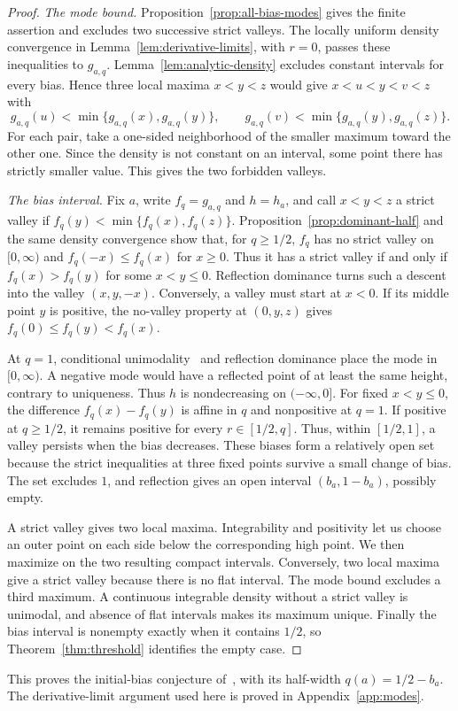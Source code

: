 \begin{proof}
\emph{The mode bound.} Proposition~\ref{prop:all-bias-modes}
gives the finite assertion and excludes two successive strict valleys.
The locally uniform density convergence in
Lemma~\ref{lem:derivative-limits}, with $r=0$, passes these
inequalities to $g_{a,q}$.
Lemma~\ref{lem:analytic-density} excludes constant intervals
for every bias. Hence three local maxima $x<y<z$
would give
$x<u<y<v<z$ with
\[
 g_{a,q}(u)<\min\{g_{a,q}(x),g_{a,q}(y)\},\qquad
 g_{a,q}(v)<\min\{g_{a,q}(y),g_{a,q}(z)\}.
\]
For each pair, take a one-sided neighborhood of the smaller maximum
toward the other one. Since the density is not constant on an
interval, some point there has strictly smaller value. This gives
the two forbidden valleys.

\emph{The bias interval.} Fix $a$, write $f_q=g_{a,q}$ and $h=h_a$,
and call $x<y<z$ a strict valley if $f_q(y)<\min\{f_q(x),f_q(z)\}$.
Proposition~\ref{prop:dominant-half} and the same density convergence show that,
for $q\ge1/2$, $f_q$ has no strict valley on $[0,\infty)$ and
$f_q(-x)\le f_q(x)$ for $x\ge0$.
Thus it has a strict valley if and only if
$f_q(x)>f_q(y)$ for some $x<y\le0$. Reflection dominance turns
such a descent into the valley $(x,y,-x)$. Conversely, a valley
must start at $x<0$. If its middle point $y$ is positive,
the no-valley property at $(0,y,z)$ gives
$f_q(0)\le f_q(y)<f_q(x)$.

At $q=1$, conditional unimodality~\cite{glrs2025} and reflection
dominance place the mode in $[0,\infty)$. A negative mode would have
a reflected point of at least the same height, contrary to uniqueness.
Thus $h$ is nondecreasing on $(-\infty,0]$. For fixed $x<y\le0$, the
difference $f_q(x)-f_q(y)$ is affine in $q$ and nonpositive at $q=1$.
If positive at $q\ge1/2$, it remains positive for every $r\in[1/2,q]$.
Thus, within $[1/2,1]$, a valley persists when the bias decreases.
These biases form a relatively open set because the strict
inequalities at three fixed points survive a small change of bias.
The set excludes $1$, and reflection gives an open interval
$(b_a,1-b_a)$, possibly empty.

A strict valley gives two local maxima. Integrability and positivity
let us choose an outer point on each side below the corresponding
high point. We then maximize on the two resulting compact
intervals. Conversely, two local
maxima give a strict valley because there is no flat interval.
The mode bound excludes a third maximum. A continuous integrable
density without a strict valley is unimodal, and absence of flat
intervals makes its maximum unique. Finally the bias interval is
nonempty exactly when it contains $1/2$, so
Theorem~\ref{thm:threshold} identifies the empty case.
\end{proof}

This proves the initial-bias conjecture
of~\cite[Remark~2.1(b)]{glrs2025}, with its half-width $q(a)=1/2-b_a$.
The derivative-limit argument used here is proved in Appendix~\ref{app:modes}.


